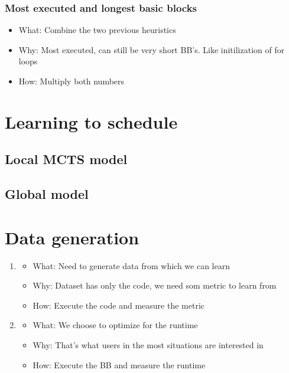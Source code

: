 \subsubsection{Most executed and longest basic blocks}
\begin{itemize}
    \item What: Combine the two previous heuristics
    \item Why: Most executed, can still be very short BB's. Like initilization of for loops
    \item How: Multiply both numbers
\end{itemize}

\section{Learning to schedule}
\subsection{Local MCTS model}
\label{subsec:approach:ml:mcts}
\subsection{Global model}
\label{subsec:approach:ml:global}

\section{Data generation}
\begin{enumerate}
    \item 
    \begin{itemize}
        \item What: Need to generate data from which we can learn
        \item Why: Dataset has only the code, we need som metric to learn from
        \item How: Execute the code and measure the metric
    \end{itemize}
    \item
    \begin{itemize}
        \item What: We choose to optimize for the runtime
        \item Why: That's what users in the most situations are interested in
        \item How: Execute the BB and measure the runtime
    \end{itemize}
\end{enumerate}

